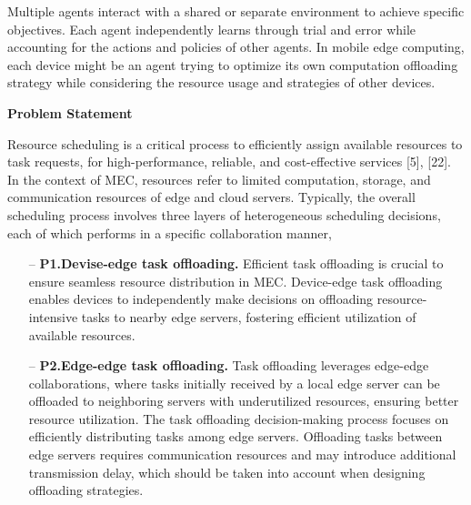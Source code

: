 \documentclass[12pt]{article}
\begin{document}
\vspace{-3mm}
\noindent
 Multiple agents interact with a shared or separate environment to achieve specific objectives. Each agent independently learns through trial and error while accounting for the actions and policies of other agents. In mobile edge computing, each device might be an agent trying to optimize its own computation offloading strategy while considering the resource usage and strategies of other devices.


\vspace{4mm}

\noindent\textbf{\large Problem Statement}

\noindent Resource scheduling is a critical process to efficiently assign available resources to task requests, for high-performance, reliable, and cost-effective services [5], [22]. In the context of MEC, resources refer to limited computation, storage, and communication resources of edge and cloud servers. Typically, the overall scheduling process involves three layers of heterogeneous scheduling decisions, each of which performs in a specific collaboration manner,


	


\begin{itemize}
	\item[--]\textbf{P1.\hspace{2mm}Devise-edge task offloading.}
	Efficient task offloading is crucial to ensure seamless resource distribution in MEC. Device-edge task offloading enables devices to independently make decisions on offloading resource-intensive tasks to nearby edge servers, fostering efficient utilization of available resources.
	
	\item[--]\textbf{P2.\hspace{2mm}Edge-edge task offloading.} 
	Task offloading leverages edge-edge collaborations, where tasks initially received by a local edge server can be offloaded to neighboring servers with underutilized resources, ensuring better resource utilization. The task offloading decision-making process focuses on efficiently distributing tasks among edge servers. Offloading tasks between edge servers requires communication resources and may introduce additional transmission delay, which should be taken into account when designing offloading strategies.
\end{itemize}
\end{document}
